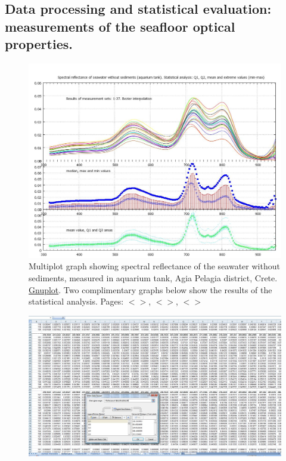 \documentclass[11pt]{article}
\begin{document}
\begin{appendices}
\subsection[Data processing and statistical evaluation]{Data processing and statistical evaluation: measurements of the seafloor optical properties.}

\begin{figure}[H]
	\centering
	\includegraphics[scale=0.30]{GNU-21.jpg}
	\caption{Multiplot graph showing spectral reflectance of the seawater without sediments, measured in aquarium tank, Agia Pelagia district, Crete. \href{http://www.gnuplot.info/}{Gnuplot}. Two complimentary graphs below show the results of the statistical analysis. Pages: $<$\pageref{page-28}$>$, $<$\pageref{dataprep}$>$, $<$\pageref{page-35}$>$}
	\label{fig:27}
\end{figure}
\begin{figure}[H]
	\begin{center}
		\includegraphics[scale=0.20]{App-1.jpg}

\end{center}
\end{figure}
\end{appendices}
\end{document}
